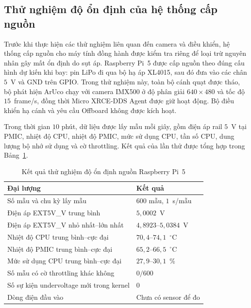 \subsection{Thử nghiệm độ ổn định của hệ thống cấp nguồn}

Trước khi thực hiện các thử nghiệm liên quan đến camera và điều khiển, hệ thống cấp nguồn cho máy tính đồng hành được kiểm tra riêng để loại trừ nguyên nhân gây mất ổn định do sụt áp. Raspberry Pi~5 được cấp nguồn theo đúng cấu hình dự kiến khi bay: pin LiPo đi qua bộ hạ áp XL4015, sau đó đưa vào các chân $5$~V và GND trên GPIO. Trong thử nghiệm này, toàn bộ cánh quạt được tháo, bộ phát hiện ArUco chạy với camera IMX500 ở độ phân giải $640\times480$ và tốc độ $15$~frame/s, đồng thời Micro XRCE-DDS Agent được giữ hoạt động. Bộ điều khiển hạ cánh và yêu cầu Offboard không được kích hoạt.

Trong thời gian $10$ phút, dữ liệu được lấy mẫu mỗi giây, gồm điện áp rail $5$~V tại PMIC, nhiệt độ CPU, nhiệt độ PMIC, mức sử dụng CPU, tần số CPU, dung lượng bộ nhớ sử dụng và cờ throttling. Kết quả của lần thử được tổng hợp trong Bảng~\ref{tab:power_stability_result}.

\begin{table}[H]
    \centering
    \small
    \caption{Kết quả thử nghiệm độ ổn định nguồn Raspberry Pi~5}
    \label{tab:power_stability_result}
    \begin{tabularx}{\textwidth}{>{\raggedright\arraybackslash}p{} X}
        \toprule
        \textbf{Đại lượng} & \textbf{Kết quả} \\
        \midrule
        Số mẫu và chu kỳ lấy mẫu & $600$ mẫu, $1$~s/mẫu \\
        Điện áp EXT5V\_V trung bình & $5{,}0002$~V \\
        Điện áp EXT5V\_V nhỏ nhất--lớn nhất & $4{,}8923$--$5{,}0384$~V \\
        Nhiệt độ CPU trung bình--cực đại & $70{,}4$--$74{,}1$~$^\circ$C \\
        Nhiệt độ PMIC trung bình--cực đại & $65{,}2$--$66{,}5$~$^\circ$C \\
        Mức sử dụng CPU trung bình--cực đại & $27{,}9$--$30{,}1$~\% \\
        Số mẫu có cờ throttling khác không & $0/600$ \\
        Số sự kiện undervoltage mới trong kernel & $0$ \\
        Dòng điện đầu vào & Chưa có sensor để đo \\
        \bottomrule
    \end{tabularx}
\end{table}

